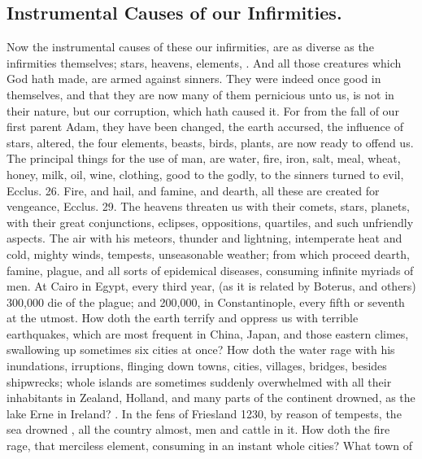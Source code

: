 {%
\clearpage{}
\subsection{Instrumental Causes of our Infirmities.}
Now the instrumental causes
of these our infirmities, are as diverse as the infirmities themselves;
stars, heavens, elements, \etc{}. And all those creatures which God hath
made, are armed against sinners. They were indeed once good in
themselves, and that they are now many of them pernicious unto us, is
not in their nature, but our corruption, which hath caused it. For from
the fall of our first parent Adam, they have been changed, the earth
accursed, the influence of stars, altered, the four elements, beasts,
birds, plants, are now ready to offend us. The principal things for the
use of man, are water, fire, iron, salt, meal, wheat, honey, milk, oil,
wine, clothing, good to the godly, to the sinners turned to evil,
Ecclus.  26. Fire, and hail, and famine, and dearth, all these
are created for vengeance, Ecclus.  29. The heavens threaten us
with their comets, stars, planets, with their great conjunctions,
eclipses, oppositions, quartiles, and such unfriendly aspects. The air
with his meteors, thunder and lightning, intemperate heat and cold,
mighty winds, tempests, unseasonable weather; from which proceed
dearth, famine, plague, and all sorts of epidemical diseases, consuming
infinite myriads of men. At Cairo in Egypt, every third year, (as it is
related by Boterus, and others) 300,000 die of the plague; and
200,000, in Constantinople, every fifth or seventh at the utmost. How
doth the earth terrify and oppress us with terrible earthquakes, which
are most frequent in China, Japan, and those eastern climes,
swallowing up sometimes six cities at once? How doth the water rage
with his inundations, irruptions, flinging down towns, cities,
villages, bridges, \etc{} besides shipwrecks; whole islands are sometimes
suddenly overwhelmed with all their inhabitants in Zealand,
Holland, and many parts of the continent drowned, as the lake Erne
in Ireland? . In the fens of Friesland 1230, by reason of tempests, the
sea drowned , all the
country almost, men and cattle in it. How doth the fire rage, that
merciless element, consuming in an instant whole cities? What town of
}
